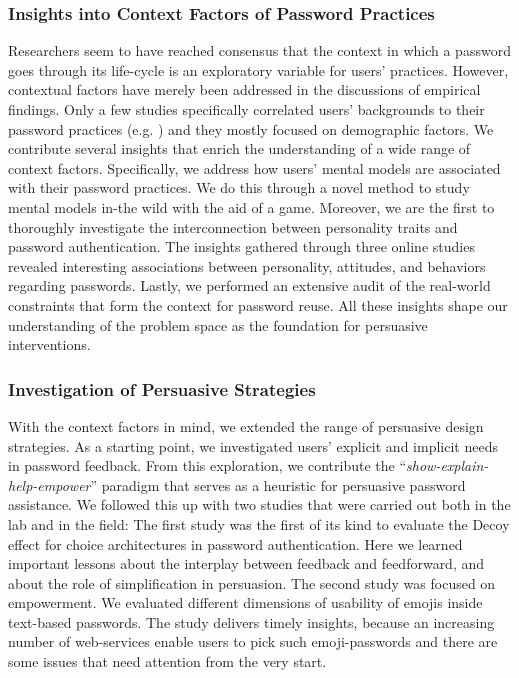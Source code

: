 \subsubsection{Insights into Context Factors of Password Practices}
Researchers seem to have reached consensus that the context in which a password goes through its life-cycle \cite{Stobert2014PasswordLifeCycle} is an exploratory variable for users' practices. However, contextual factors have merely been addressed in the discussions of empirical findings. Only a few studies specifically correlated users' backgrounds to their password practices (e.g. \cite{Kessem2018IBMFutureIdentity, Mazurek2013Measuring}) and they mostly focused on demographic factors. We contribute several insights that enrich the understanding of a wide range of context factors. Specifically, we address how users' mental models are associated with their password practices. We do this through a novel method to study mental models in-the wild with the aid of a game. Moreover, we are the first to thoroughly investigate the interconnection between personality traits and password authentication. The insights gathered through three online studies revealed interesting associations between personality, attitudes, and behaviors regarding passwords. Lastly, we performed an extensive audit of the real-world constraints that form the context for password reuse. All these insights shape our understanding of the problem space as the foundation for persuasive interventions. 

\subsubsection{Investigation of Persuasive Strategies}
With the context factors in mind, we extended the range of persuasive design strategies. As a starting point, we investigated users' explicit and implicit needs in password feedback. From this exploration, we contribute the ``\textit{show-explain-help-empower}'' paradigm that serves as a heuristic for persuasive password assistance. We followed this up with two studies that were carried out both in the lab and in the field: The first study was the first of its kind to evaluate the Decoy effect for choice architectures in password authentication. Here we learned important lessons about the interplay between feedback and feedforward, and about the role of simplification in persuasion. The second study was focused on empowerment. We evaluated different dimensions of usability of emojis inside text-based passwords. The study delivers timely insights, because an increasing number of web-services enable users to pick such emoji-passwords and there are some issues that need attention from the very start. 


